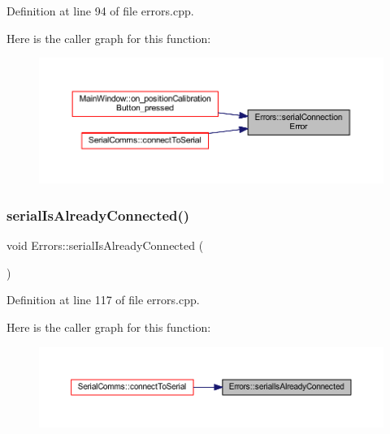 Definition at line 94 of file errors.\+cpp.

Here is the caller graph for this function\+:
\nopagebreak
\begin{figure}[H]
\begin{center}
\leavevmode
\includegraphics[width=350pt]{classErrors_a5ed088325fbe34556ae24b8167eaf0fd_icgraph}
\end{center}
\end{figure}
\mbox{\label{classErrors_ad05246aaafe8e4e546e7b28bd2a21312}} 
\subsubsection{\texorpdfstring{serialIsAlreadyConnected()}{serialIsAlreadyConnected()}}
{\footnotesize\ttfamily void Errors\+::serial\+Is\+Already\+Connected (\begin{DoxyParamCaption}{ }\end{DoxyParamCaption})\hspace{0.3cm}{\ttfamily [static]}}



Definition at line 117 of file errors.\+cpp.

Here is the caller graph for this function\+:
\nopagebreak
\begin{figure}[H]
\begin{center}
\leavevmode
\includegraphics[width=350pt]{classErrors_ad05246aaafe8e4e546e7b28bd2a21312_icgraph}
\end{center}
\end{figure}
\mbox{\label{classErrors_a4d1bdcbd36b5df8317a4511226c5d55a}} 
